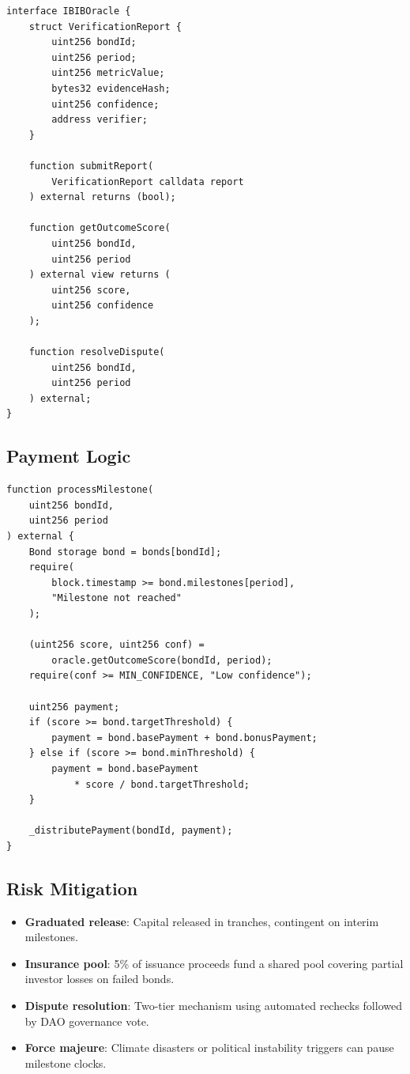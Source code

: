 \documentclass[11pt,a4paper]{article}
\begin{document}
\begin{lstlisting}[caption={Oracle verification interface.},
  label={lst:oracle}]
interface IBIBOracle {
    struct VerificationReport {
        uint256 bondId;
        uint256 period;
        uint256 metricValue;
        bytes32 evidenceHash;
        uint256 confidence;
        address verifier;
    }

    function submitReport(
        VerificationReport calldata report
    ) external returns (bool);

    function getOutcomeScore(
        uint256 bondId,
        uint256 period
    ) external view returns (
        uint256 score,
        uint256 confidence
    );

    function resolveDispute(
        uint256 bondId,
        uint256 period
    ) external;
}
\end{lstlisting}

\subsection{Payment Logic}

\begin{lstlisting}[caption={Milestone payment logic.},
  label={lst:payment}]
function processMilestone(
    uint256 bondId,
    uint256 period
) external {
    Bond storage bond = bonds[bondId];
    require(
        block.timestamp >= bond.milestones[period],
        "Milestone not reached"
    );

    (uint256 score, uint256 conf) =
        oracle.getOutcomeScore(bondId, period);
    require(conf >= MIN_CONFIDENCE, "Low confidence");

    uint256 payment;
    if (score >= bond.targetThreshold) {
        payment = bond.basePayment + bond.bonusPayment;
    } else if (score >= bond.minThreshold) {
        payment = bond.basePayment
            * score / bond.targetThreshold;
    }

    _distributePayment(bondId, payment);
}
\end{lstlisting}

\subsection{Risk Mitigation}

\begin{itemize}
  \item \textbf{Graduated release}: Capital released in tranches,
    contingent on interim milestones.
  \item \textbf{Insurance pool}: 5\% of issuance proceeds fund a shared
    pool covering partial investor losses on failed bonds.
  \item \textbf{Dispute resolution}: Two-tier mechanism using automated
    rechecks followed by DAO governance vote.
  \item \textbf{Force majeure}: Climate disasters or political
    instability triggers can pause milestone clocks.
\end{itemize}
\end{document}
